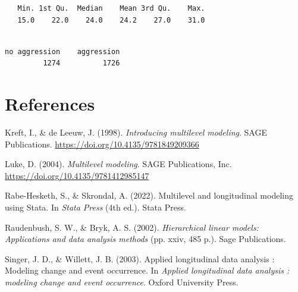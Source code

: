 \documentclass[
  letterpaper,
  DIV=11,
  numbers=noendperiod]{scrreprt}
\newenvironment{Shaded}{\begin{snugshade}}{\end{snugshade}}
\newcommand{\FunctionTok}[1]{\textcolor[rgb]{0.28,0.35,0.67}{#1}}
\newcommand{\NormalTok}[1]{\textcolor[rgb]{0.00,0.23,0.31}{#1}}
\newcommand{\SpecialCharTok}[1]{\textcolor[rgb]{0.37,0.37,0.37}{#1}}
\newlength{\cslhangindent}
\newlength{\cslentryspacingunit} %
\newenvironment{CSLReferences}[2] %
 {%
  \setlength{\parindent}{0pt}
  \ifodd #1
  \let\oldpar\par
  \def\par{\hangindent=\cslhangindent\oldpar}
  \fi
  \setlength{\parskip}{#2\cslentryspacingunit}
 }%
 {}
\begin{document}
\begin{Shaded}
\end{Shaded}

\begin{verbatim}
   Min. 1st Qu.  Median    Mean 3rd Qu.    Max. 
   15.0    22.0    24.0    24.2    27.0    31.0 
\end{verbatim}

\begin{Shaded}
\end{Shaded}

\begin{verbatim}

no aggression    aggression 
         1274          1726 
\end{verbatim}


\hypertarget{references}{%
\chapter*{References}\label{references}}


\hypertarget{refs}{}
\begin{CSLReferences}{1}{0}
\leavevmode{}%
Kreft, I., \& de Leeuw, J. (1998). \emph{Introducing multilevel
modeling}. SAGE Publications.
\url{https://doi.org/10.4135/9781849209366}

\leavevmode{}%
Luke, D. (2004). \emph{Multilevel modeling}. SAGE Publications, Inc.
\url{https://doi.org/10.4135/9781412985147}

\leavevmode{}%
Rabe-Hesketh, S., \& Skrondal, A. (2022). Multilevel and longitudinal
modeling using {S}tata. In \emph{Stata Press} (4th ed.). Stata Press.

\leavevmode{}%
Raudenbush, S. W., \& Bryk, A. S. (2002). \emph{Hierarchical linear
models: Applications and data analysis methods} (pp. xxiv, 485 p.). Sage
Publications.

\leavevmode{}%
Singer, J. D., \& Willett, J. B. (2003). Applied longitudinal data
analysis : Modeling change and event occurrence. In \emph{Applied
longitudinal data analysis : modeling change and event occurrence}.
Oxford University Press.

\end{CSLReferences}
\end{document}
